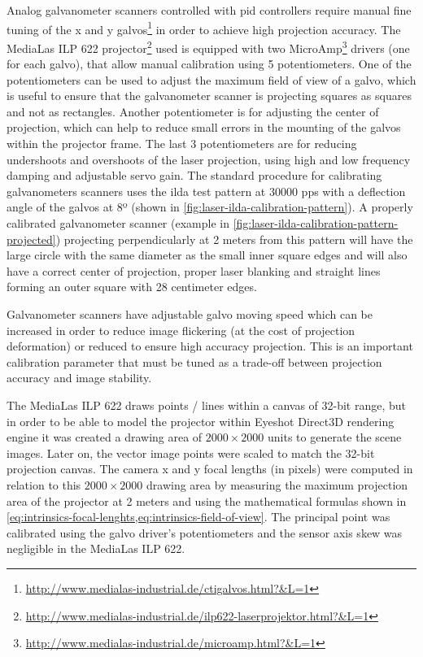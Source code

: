 Analog galvanometer scanners controlled with \gls{pid} controllers require manual fine tuning of the x and y galvos\footnote{\url{http://www.medialas-industrial.de/ctigalvos.html?&L=1}} in order to achieve high projection accuracy. The MediaLas ILP 622 projector\footnote{\url{http://www.medialas-industrial.de/ilp622-laserprojektor.html?&L=1}} used is equipped with two MicroAmp\footnote{\url{http://www.medialas-industrial.de/microamp.html?&L=1}} drivers (one for each galvo), that allow manual calibration using 5 potentiometers. One of the potentiometers can be used to adjust the maximum field of view of a galvo, which is useful to ensure that the galvanometer scanner is projecting squares as squares and not as rectangles. Another potentiometer is for adjusting the center of projection, which can help to reduce small errors in the mounting of the galvos within the projector frame. The last 3 potentiometers are for reducing undershoots and overshoots of the laser projection, using high and low frequency damping and adjustable servo gain. The standard procedure for calibrating galvanometers scanners uses the \gls{ilda} test pattern at 30000 \gls{pps} with a deflection angle of the galvos at 8º (shown in \cref{fig:laser-ilda-calibration-pattern}). A properly calibrated galvanometer scanner (example in \cref{fig:laser-ilda-calibration-pattern-projected}) projecting perpendicularly at 2 meters from this pattern will have the large circle with the same diameter as the small inner square edges and will also have a correct center of projection, proper laser blanking and straight lines forming an outer square with 28 centimeter edges.

Galvanometer scanners have adjustable galvo moving speed which can be increased in order to reduce image flickering (at the cost of projection deformation) or reduced to ensure high accuracy projection. This is an important calibration parameter that must be tuned as a trade-off between projection accuracy and image stability.

The MediaLas ILP 622 draws points / lines within a canvas of 32-bit range, but in order to be able to model the projector within Eyeshot Direct3D rendering engine it was created a drawing area of $2000 \times 2000$ units to generate the scene images. Later on, the vector image points were scaled to match the 32-bit projection canvas. The camera x and y focal lengths (in pixels) were computed in relation to this $2000 \times 2000$ drawing area by measuring the maximum projection area of the projector at 2 meters and using the mathematical formulas shown in \cref{eq:intrinsics-focal-lenghts,eq:intrinsics-field-of-view}. The principal point was calibrated using the galvo driver’s potentiometers and the sensor axis skew was negligible in the MediaLas ILP 622.

